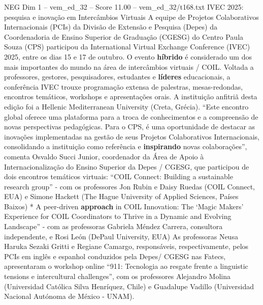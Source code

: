 \begin{textsample}{NEG Dim 1 – vem\_ed\_32 – Score 11.00 – vem\_ed\_32/t168.txt}  \label{ex:f1_neg_155}
IVEC 2025: pesquisa e inovação em Intercâmbios Virtuais A equipe de Projetos Colaborativos Internacionais (PCIs) da Divisão de Extensão e Pesquisa (Depes) da Coordenadoria de Ensino Superior de Graduação (CGESG) do Centro Paula Souza (CPS) participou da International Virtual Exchange Conference (IVEC) 2025, entre os dias 15 e 17 de outubro.
O evento \textbf{híbrido} é considerado um dos mais importantes do mundo na área de intercâmbios virtuais / COIL.
Voltada a professores, gestores, pesquisadores, estudantes e \textbf{líderes} educacionais, a conferência IVEC trouxe programação extensa de palestras, mesas-redondas, encontros temáticos, workshops e apresentações orais.
A instituição anfitriã desta edição foi a Hellenic Mediterranean University (Creta, Grécia). “Este encontro global oferece uma plataforma para a troca de conhecimentos e a compreensão de novas perspectivas pedagógicas.
Para o CPS, é uma oportunidade de destacar as inovações implementadas na gestão de seus Projetos Colaborativos Internacionais, consolidando a instituição como referência e \textbf{inspirando} novas colaborações”, comenta Osvaldo Succi Junior, coordenador da Área de Apoio à Internacionalização do Ensino Superior da Depes / CGESG, que participou de dois encontros temáticos virtuais: “COIL Connect: Building a sustainable research group” - com os professores Jon Rubin e Daisy Ruedas (COIL Connect, EUA) e Simone Hackett (The Hague University of Applied Sciences, Países Baixos) * A peer-driven \textbf{approach} in COIL Innovation: The ‘Magic Makers’ Experience for COIL Coordinators to Thrive in a Dynamic and Evolving Landscape” - com as professoras Gabriela Méndez Carrera, consultora independente, e Rosi León (DePaul University, EUA) As professoras Neusa Haruka Sezaki Gritti e Regiane Camargo, responsáveis, respectivamente, pelos PCIs em inglês e espanhol conduzidos pela Depes/ CGESG nas Fatecs, apresentaram o workshop online “911: Tecnologia ao resgate frente a linguistic tensions e intercultural challenges”, com os professores Alejandro Molina (Universidad Católica Silva Henríquez, Chile) e Guadalupe Vadillo (Universidad Nacional Autónoma de México - UNAM).

\end{textsample}
